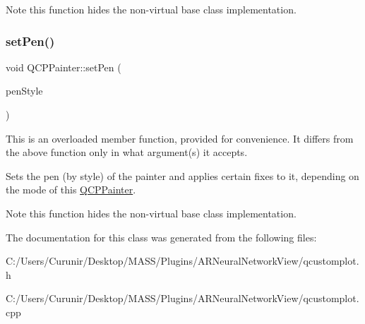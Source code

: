 \begin{DoxyNote}{Note}
this function hides the non-\/virtual base class implementation. 
\end{DoxyNote}
\mbox{\label{class_q_c_p_painter_a25e76095aae41da0d08035060e5f81ca}} 
\subsubsection{\texorpdfstring{set\+Pen()}{setPen()}\hspace{0.1cm}{\footnotesize\ttfamily [3/3]}}
{\footnotesize\ttfamily void Q\+C\+P\+Painter\+::set\+Pen (\begin{DoxyParamCaption}\item[{Qt\+::\+Pen\+Style}]{pen\+Style }\end{DoxyParamCaption})}

This is an overloaded member function, provided for convenience. It differs from the above function only in what argument(s) it accepts.

Sets the pen (by style) of the painter and applies certain fixes to it, depending on the mode of this \hyperlink{class_q_c_p_painter}{Q\+C\+P\+Painter}.

\begin{DoxyNote}{Note}
this function hides the non-\/virtual base class implementation. 
\end{DoxyNote}


The documentation for this class was generated from the following files\+:\begin{DoxyCompactItemize}
\item 
C\+:/\+Users/\+Curunir/\+Desktop/\+M\+A\+S\+S/\+Plugins/\+A\+R\+Neural\+Network\+View/qcustomplot.\+h\item 
C\+:/\+Users/\+Curunir/\+Desktop/\+M\+A\+S\+S/\+Plugins/\+A\+R\+Neural\+Network\+View/qcustomplot.\+cpp\end{DoxyCompactItemize}
